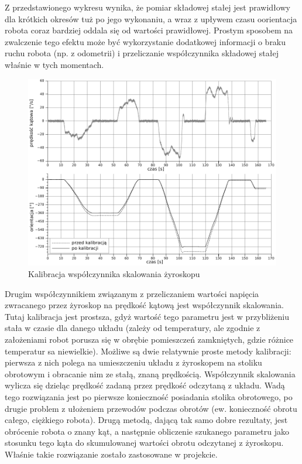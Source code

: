Z przedstawionego wykresu wynika, że pomiar składowej stałej jest prawidłowy dla
krótkich okresów tuż po jego wykonaniu, a wraz z upływem czasu oorientacja
robota coraz bardziej oddala się od wartości prawidłowej. Prostym sposobem na
zwalczenie tego efektu może być wykorzystanie dodatkowej informacji o braku
ruchu robota (np. z odometrii) i przeliczanie współczynnika składowej stałej
właśnie w tych momentach.

\begin{figure}[ht!]
\centering
\includegraphics[width=\textwidth]{../../Common/pomiary/gyro_rot_bw}
\caption{Kalibracja współczynnika skalowania żyroskopu}
\label{fig:gyro_rot}
\end{figure}

Drugim współczynnikiem związanym z przeliczaniem wartości napięcia zwracanego
przez żyroskop na prędkość kątową jest współczynnik skalowania. Tutaj kalibracja
jest prostsza, gdyż wartość tego parametru jest w przybliżeniu stała w czasie
dla danego układu (zależy od temperatury, ale zgodnie z założeniami robot
porusza się w obrębie pomieszczeń zamkniętych, gdzie różnice temperatur sa
niewielkie). Możliwe są dwie relatywnie proste metody kalibracji: pierwsza z
nich polega na umieszczeniu układu z żyroskopem na stoliku obrotowym i obracanie
nim ze stałą, znaną prędkością. Współczynnik skalowania wylicza się dzieląc
prędkość zadaną przez prędkość odczytaną z układu. Wadą tego rozwiązania jest po
pierwsze konieczność posiadania stolika obrotowego, po drugie problem z
ułożeniem przewodów podczas obrotów (ew. konieczność obrotu całego, ciężkiego
robota). Drugą metodą, dającą tak samo dobre rezultaty, jest obrócenie robota o
znany kąt, a następnie obliczenie szukanego parametru jako stosunku tego kąta do
skumulowanej wartości obrotu odczytanej z żyroskopu. Właśnie takie rozwiązanie
zostało zastosowane w projekcie.

